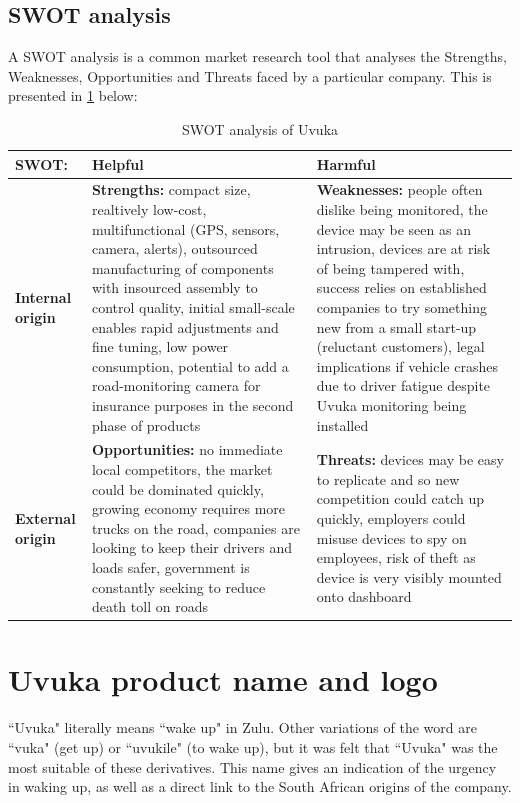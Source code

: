  \subsection{SWOT analysis}
A SWOT analysis is a common market research tool that analyses the Strengths, Weaknesses, Opportunities and Threats faced by a particular company. This is presented in \cref{tab:SWOT} below:
\begin{table}[htbp]
	\centering
	\caption{SWOT analysis of Uvuka}
	\begin{tabular}{|m{3cm}|m{6cm}|m{6cm}|}
		\hline
		\textbf{SWOT:} & \textbf{Helpful} & \textbf{Harmful} \\
		\hline
		\textbf{Internal origin} & \textbf{Strengths:}  compact size, realtively low-cost, multifunctional (GPS, sensors, camera, alerts), outsourced manufacturing of components with insourced assembly to control quality, initial small-scale enables rapid adjustments and fine tuning, low power consumption, potential to add a road-monitoring camera for insurance purposes in the second phase of products & \textbf{Weaknesses:} people often dislike being monitored, the device may be seen as an intrusion, devices are at risk of being tampered with, success relies on established companies to try something new from a small start-up (reluctant customers), legal implications if vehicle crashes due to driver fatigue despite Uvuka monitoring being installed \\
		\hline
		\textbf{External origin} & \textbf{Opportunities:} no immediate local competitors, the market could be dominated quickly, growing economy requires more trucks on the road, companies are looking to keep their drivers and loads safer, government is constantly seeking to reduce death toll on roads & \textbf{Threats:} devices may be easy to replicate and so new competition could catch up quickly, employers could misuse devices to spy on employees, risk of theft as device is very visibly mounted onto dashboard \\
		\hline
	\end{tabular}%
	\label{tab:SWOT}%
\end{table}%

\section{Uvuka product name and logo}
``Uvuka" literally means ``wake up" in Zulu. Other variations of the word are ``vuka" (get up) or ``uvukile" (to wake up), but it was felt that ``Uvuka" was the most suitable of these derivatives. This name gives an indication of the urgency in waking up, as well as a direct link to the South African origins of the company.


